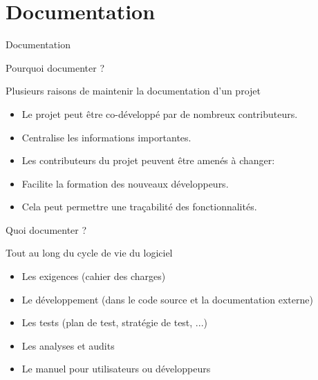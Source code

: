 \section{Documentation}

\begin{frame}{Documentation}  
\end{frame}

\begin{frame}{Pourquoi documenter ?}
  \begin{block}{Plusieurs raisons de maintenir la documentation d'un projet}
    \begin{itemize}
    \item Le projet peut être co-développé par de nombreux contributeurs.
    \item Centralise les informations importantes.
    \item Les contributeurs du projet peuvent être amenés à changer:
    \item Facilite la formation des nouveaux développeurs.
    \item Cela peut permettre une traçabilité des fonctionnalités.
    \end{itemize}
  \end{block}
\end{frame}

\begin{frame}{Quoi documenter ?}
  \begin{block}{Tout au long du cycle de vie du logiciel}
    \begin{itemize}
    \item Les exigences (cahier des charges)
    \item Le développement (dans le code source et la documentation externe)
    \item Les tests (plan de test, stratégie de test, ...)
    \item Les analyses et audits
    \item Le manuel pour utilisateurs ou développeurs
    \end{itemize}
  \end{block}
\end{frame}

